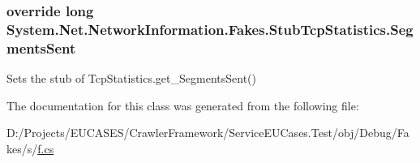 \hypertarget{class_system_1_1_net_1_1_network_information_1_1_fakes_1_1_stub_tcp_statistics_a200e32df50a69e71b0eaa0084d49349c}{
\subsubsection[{Segments\-Sent}]{\setlength{\rightskip}{0pt plus 5cm}override long System.\-Net.\-Network\-Information.\-Fakes.\-Stub\-Tcp\-Statistics.\-Segments\-Sent\hspace{0.3cm}{\ttfamily [get]}}}\label{class_system_1_1_net_1_1_network_information_1_1_fakes_1_1_stub_tcp_statistics_a200e32df50a69e71b0eaa0084d49349c}


Sets the stub of Tcp\-Statistics.\-get\-\_\-\-Segments\-Sent()



The documentation for this class was generated from the following file\-:\begin{DoxyCompactItemize}
\item 
D\-:/\-Projects/\-E\-U\-C\-A\-S\-E\-S/\-Crawler\-Framework/\-Service\-E\-U\-Cases.\-Test/obj/\-Debug/\-Fakes/s/\hyperlink{s_2f_8cs}{f.\-cs}\end{DoxyCompactItemize}
